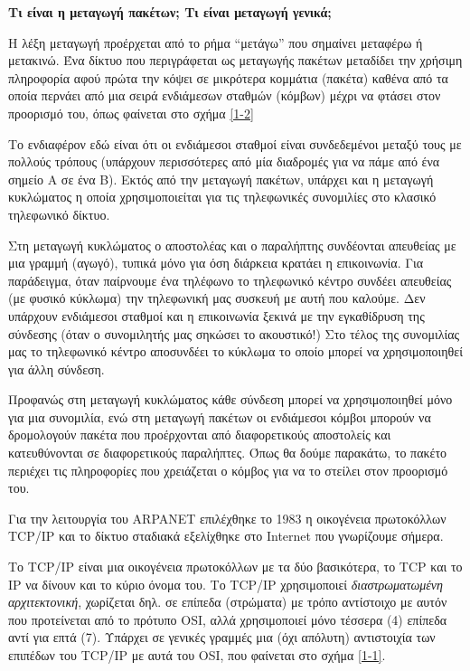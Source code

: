 \begin{inthebox}
\textbf{Τι είναι η μεταγωγή πακέτων; Τι είναι μεταγωγή γενικά;}

Η λέξη μεταγωγή προέρχεται από το ρήμα ``μετάγω'' που σημαίνει μεταφέρω ή μετακινώ.
Ένα δίκτυο που περιγράφεται ως μεταγωγής πακέτων μεταδίδει την χρήσιμη πληροφορία αφού πρώτα
την κόψει σε μικρότερα κομμάτια (πακέτα) καθένα από τα οποία περνάει από μια σειρά ενδιάμεσων σταθμών
(κόμβων) μέχρι να φτάσει στον προορισμό του, όπως φαίνεται στο σχήμα \ref{1-2}

Το ενδιαφέρον εδώ είναι ότι οι ενδιάμεσοι σταθμοί είναι συνδεδεμένοι μεταξύ τους
με πολλούς τρόπους (υπάρχουν περισσότερες από μία διαδρομές για να πάμε από
ένα σημείο Α σε ένα Β). Εκτός από την μεταγωγή πακέτων, υπάρχει και η μεταγωγή
κυκλώματος η οποία χρησιμοποιείται για τις τηλεφωνικές συνομιλίες στο κλασικό
τηλεφωνικό δίκτυο.

Στη μεταγωγή κυκλώματος ο αποστολέας και ο παραλήπτης συνδέονται απευθείας με
μια γραμμή (αγωγό), τυπικά μόνο για όση διάρκεια κρατάει η επικοινωνία. Για
παράδειγμα, όταν παίρνουμε ένα τηλέφωνο το τηλεφωνικό κέντρο συνδέει απευθείας
(με φυσικό κύκλωμα) την τηλεφωνική μας συσκευή με αυτή που καλούμε. Δεν
υπάρχουν ενδιάμεσοι σταθμοί και η επικοινωνία ξεκινά με την εγκαθίδρυση της
σύνδεσης (όταν ο συνομιλητής μας σηκώσει το ακουστικό!) Στο τέλος της
συνομιλίας μας το τηλεφωνικό κέντρο αποσυνδέει το κύκλωμα το οποίο μπορεί να
χρησιμοποιηθεί για άλλη σύνδεση.

Προφανώς στη μεταγωγή κυκλώματος κάθε σύνδεση μπορεί να χρησιμοποιηθεί μόνο
για μια συνομιλία, ενώ στη μεταγωγή πακέτων οι ενδιάμεσοι κόμβοι μπορούν να
δρομολογούν πακέτα που προέρχονται από διαφορετικούς αποστολείς και
κατευθύνονται σε διαφορετικούς παραλήπτες. Όπως θα δούμε παρακάτω, το πακέτο
περιέχει τις πληροφορίες που χρειάζεται ο κόμβος για να το στείλει στον
προορισμό του.
\end{inthebox}

Για την λειτουργία του ARPANET επιλέχθηκε το 1983 η οικογένεια πρωτοκόλλων
TCP/IP και το δίκτυο σταδιακά εξελίχθηκε στο Internet που γνωρίζουμε σήμερα.

Το TCP/IP είναι μια οικογένεια πρωτοκόλλων με τα δύο βασικότερα, το TCP και το
IP να δίνουν και το κύριο όνομα του. Το TCP/IP χρησιμοποιεί \emph{διαστρωματωμένη
αρχιτεκτονική}, χωρίζεται δηλ. σε επίπεδα (στρώματα) με τρόπο αντίστοιχο με
αυτόν που προτείνεται από το πρότυπο OSI, αλλά χρησιμοποιεί μόνο τέσσερα (4)
επίπεδα αντί για επτά (7). Υπάρχει σε γενικές γραμμές μια (όχι απόλυτη) αντιστοιχία
των επιπέδων του TCP/IP με αυτά του OSI, που φαίνεται στο σχήμα \ref{1-1}.

